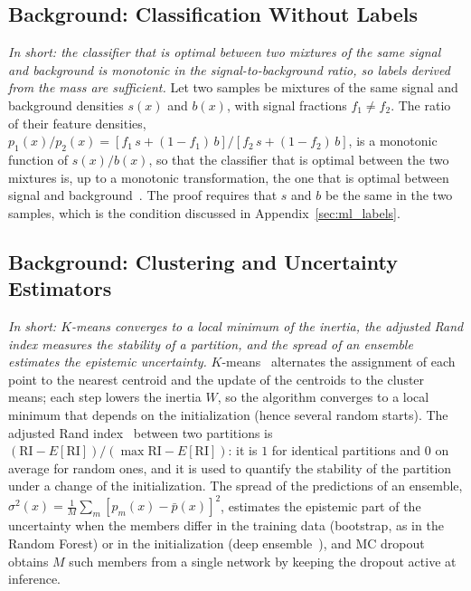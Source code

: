 \subsection{Background: Classification Without Labels}
\emph{In short: the classifier that is optimal between two mixtures of the same signal and background is monotonic in the signal-to-background ratio, so labels derived from the mass are sufficient.}
Let two samples be mixtures of the same signal and background densities $s(x)$ and $b(x)$, with signal fractions $f_1\neq f_2$. The ratio of their feature densities, $p_1(x)/p_2(x)=[f_1\,s+(1-f_1)\,b]/[f_2\,s+(1-f_2)\,b]$, is a monotonic function of $s(x)/b(x)$, so that the classifier that is optimal between the two mixtures is, up to a monotonic transformation, the one that is optimal between signal and background~\cite{cwola}. The proof requires that $s$ and $b$ be the same in the two samples, which is the condition discussed in Appendix~\ref{sec:ml_labels}.

\subsection{Background: Clustering and Uncertainty Estimators}
\emph{In short: $K$-means converges to a local minimum of the inertia, the adjusted Rand index measures the stability of a partition, and the spread of an ensemble estimates the epistemic uncertainty.}
$K$-means~\cite{lloyd_kmeans} alternates the assignment of each point to the nearest centroid and the update of the centroids to the cluster means; each step lowers the inertia $W$, so the algorithm converges to a local minimum that depends on the initialization (hence several random starts). The adjusted Rand index~\cite{hubert_ari} between two partitions is $(\mathrm{RI}-E[\mathrm{RI}])/(\max\mathrm{RI}-E[\mathrm{RI}])$: it is $1$ for identical partitions and $0$ on average for random ones, and it is used to quantify the stability of the partition under a change of the initialization. The spread of the predictions of an ensemble, $\sigma^2(x)=\frac1M\sum_m[p_m(x)-\bar p(x)]^2$, estimates the epistemic part of the uncertainty when the members differ in the training data (bootstrap, as in the Random Forest) or in the initialization (deep ensemble~\cite{deep_ensembles}), and MC dropout~\cite{gal_mcdropout} obtains $M$ such members from a single network by keeping the dropout active at inference.

